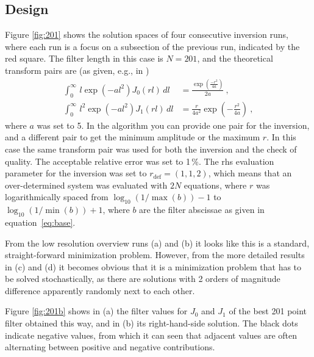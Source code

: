 \documentclass[paper,twocolumn,twoside]{geophysics}
\newcommand{\mr}[1]{\mathrm{#1}}
\begin{document}
\subsection{Design}
Figure \ref{fig:201} shows the solution spaces of four consecutive inversion
runs, where each run is a focus on a subsection of the previous run, indicated
by the red square.
%
%
%
The filter length in this case is $N=201$, and the theoretical transform pairs
are (as given, e.g., in \cite{USGS.75.Anderson})
%
\begin{align}
  \int^\infty_0\,l \exp\left(-al^2\right) J_0(rl)\,dl &=
  \frac{\exp\left(\frac{-r^2}{4a}\right)}{2a}\ , \\
  \int^\infty_0\,l^2 \exp\left(-al^2\right) J_1(rl)\,dl &=
  \frac{r}{4a^2} \exp\left(-\frac{r^2}{4a}\right)\ ,
  \label{eq:j01}
\end{align}
%
where $a$ was set to 5. In the algorithm you can provide one pair for the inversion, and a different pair to get the minimum amplitude or the maximum $r$. In
this case the same transform pair was used for both the inversion and the check
of quality. The acceptable relative error was set to 1\,\%.
The rhs evaluation parameter for the inversion was set to $r_\mr{def} = (1, 1,
2)$, which means that an over-determined system was evaluated with $2N$
equations, where $r$ was logarithmically spaced from $\log_{10}(1/\max(b)) - 1$
to $\log_{10}(1/\min(b)) + 1$, where $b$ are the filter abscissae as given in
equation~\ref{eq:base}.

From the low resolution overview runs (a) and (b) it looks like this is a
standard, straight-forward minimization problem. However, from the more
detailed results in (c) and (d) it becomes obvious that it is a minimization
problem that has to be solved stochastically, as there are solutions with 2
orders of magnitude difference apparently randomly next to each other.

Figure \ref{fig:201b} shows in (a) the filter values for $J_0$ and $J_1$ of the
best 201 point filter obtained this way, and in (b) its right-hand-side
solution. The black dots indicate negative values, from which it can seen that
adjacent values are often alternating between positive and negative
contributions.
%
%
\end{document}
